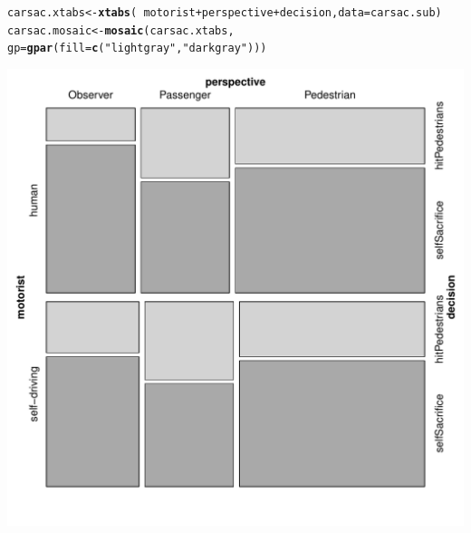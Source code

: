 \documentclass{scrartcl}\usepackage[]{graphicx}\usepackage[]{color}
\makeatletter
\def\maxwidth{ %
  \ifdim\Gin@nat@width>\linewidth
    \linewidth
  \else
    \Gin@nat@width
  \fi
}
\newcommand{\hlstr}[1]{\textcolor[rgb]{0.192,0.494,0.8}{#1}}%
\newcommand{\hlopt}[1]{\textcolor[rgb]{0,0,0}{#1}}%
\newcommand{\hlstd}[1]{\textcolor[rgb]{0.345,0.345,0.345}{#1}}%
\newcommand{\hlkwb}[1]{\textcolor[rgb]{0.69,0.353,0.396}{#1}}%
\newcommand{\hlkwc}[1]{\textcolor[rgb]{0.333,0.667,0.333}{#1}}%
\newcommand{\hlkwd}[1]{\textcolor[rgb]{0.737,0.353,0.396}{\textbf{#1}}}%
\newenvironment{kframe}{%
 \def\at@end@of@kframe{}%
 \ifinner\ifhmode%
  \def\at@end@of@kframe{\end{minipage}}%
  \begin{minipage}{\columnwidth}%
 \fi\fi%
 \def\FrameCommand##1{\hskip\@totalleftmargin \hskip-\fboxsep
 \colorbox{shadecolor}{##1}\hskip-\fboxsep
     \hskip-\linewidth \hskip-\@totalleftmargin \hskip\columnwidth}%
 \MakeFramed {\advance\hsize-\width
   \@totalleftmargin\z@ \linewidth\hsize
   \@setminipage}}%
 {\par\unskip\endMakeFramed%
 \at@end@of@kframe}
\newenvironment{knitrout}{}{} %
\makeatother
\begin{document}
\begin{knitrout}
\color{fgcolor}\begin{kframe}
\begin{alltt}
\hlstd{carsac.xtabs} \hlkwb{<-} \hlkwd{xtabs}\hlstd{(}\hlopt{~} \hlstd{motorist} \hlopt{+} \hlstd{perspective} \hlopt{+} \hlstd{decision,} \hlkwc{data} \hlstd{= carsac.sub)}
\hlstd{carsac.mosaic} \hlkwb{<-} \hlkwd{mosaic}\hlstd{(carsac.xtabs,}
                       \hlkwc{gp} \hlstd{=} \hlkwd{gpar}\hlstd{(}\hlkwc{fill} \hlstd{=} \hlkwd{c}\hlstd{(}\hlstr{"light gray"}\hlstd{,} \hlstr{"dark gray"}\hlstd{)))}
\end{alltt}
\end{kframe}
\includegraphics[width=\maxwidth]{figure/carsac-mosaic-1} 

\end{knitrout}
\end{document}
